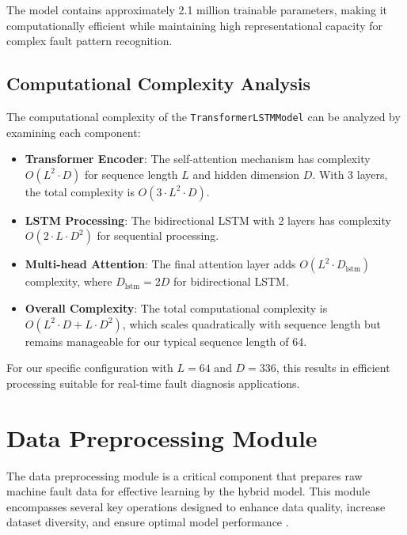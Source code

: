 The model contains approximately 2.1 million trainable parameters, making it computationally efficient while maintaining high representational capacity for complex fault pattern recognition.

\subsection{Computational Complexity Analysis}
\label{subsec:complexity_analysis}

The computational complexity of the \texttt{TransformerLSTMModel} can be analyzed by examining each component:

\begin{itemize}
    \item \textbf{Transformer Encoder}: The self-attention mechanism has complexity $O(L^2 \cdot D)$ for sequence length $L$ and hidden dimension $D$. With 3 layers, the total complexity is $O(3 \cdot L^2 \cdot D)$.
    
    \item \textbf{LSTM Processing}: The bidirectional LSTM with 2 layers has complexity $O(2 \cdot L \cdot D^2)$ for sequential processing.
    
    \item \textbf{Multi-head Attention}: The final attention layer adds $O(L^2 \cdot D_{\text{lstm}})$ complexity, where $D_{\text{lstm}} = 2D$ for bidirectional LSTM.
    
    \item \textbf{Overall Complexity}: The total computational complexity is $O(L^2 \cdot D + L \cdot D^2)$, which scales quadratically with sequence length but remains manageable for our typical sequence length of 64.
\end{itemize}

For our specific configuration with $L = 64$ and $D = 336$, this results in efficient processing suitable for real-time fault diagnosis applications.

\section{Data Preprocessing Module}
\label{sec:hybrid_model:preprocessing}

The data preprocessing module is a critical component that prepares raw machine fault data for effective learning by the hybrid model. This module encompasses several key operations designed to enhance data quality, increase dataset diversity, and ensure optimal model performance \citep{zhang2019deep, liu2018artificial}.

